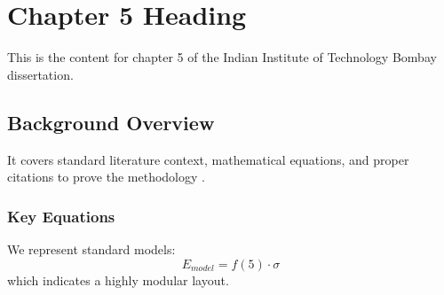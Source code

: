 \chapter{Chapter 5 Heading}
\label{ch:chapter5}
This is the content for chapter 5 of the Indian Institute of Technology Bombay dissertation.

\section{Background Overview}
It covers standard literature context, mathematical equations, and proper citations to prove the methodology \cite{texbook}.

\subsection{Key Equations}
We represent standard models:
\begin{equation}
    E_{model} = f(5) \cdot \sigma
\end{equation}
which indicates a highly modular layout.
